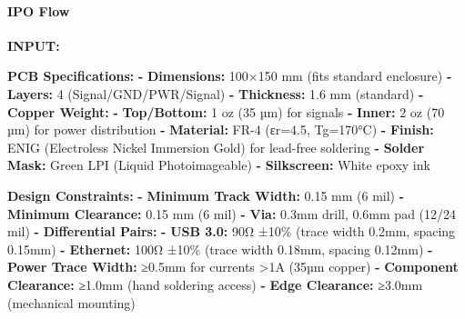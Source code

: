 \documentclass[
]{article}
\newenvironment{Shaded}{\begin{snugshade}}{\end{snugshade}}
\newcommand{\AttributeTok}[1]{\textcolor[rgb]{0.13,0.29,0.53}{#1}}
\newcommand{\FunctionTok}[1]{\textcolor[rgb]{0.13,0.29,0.53}{\textbf{#1}}}
\newcommand{\KeywordTok}[1]{\textcolor[rgb]{0.13,0.29,0.53}{\textbf{#1}}}
\begin{document}
\hypertarget{ipo-flow-3}{%
\paragraph{IPO Flow}\label{ipo-flow-3}}

\textbf{INPUT:}

\begin{Shaded}
\begin{Highlighting}[]
\FunctionTok{PCB Specifications}\KeywordTok{:}
\AttributeTok{  }\KeywordTok{{-}}\AttributeTok{ }\FunctionTok{Dimensions}\KeywordTok{:}\AttributeTok{ 100×150 mm (fits standard enclosure)}
\AttributeTok{  }\KeywordTok{{-}}\AttributeTok{ }\FunctionTok{Layers}\KeywordTok{:}\AttributeTok{ 4 (Signal/GND/PWR/Signal)}
\AttributeTok{  }\KeywordTok{{-}}\AttributeTok{ }\FunctionTok{Thickness}\KeywordTok{:}\AttributeTok{ 1.6 mm (standard)}
\AttributeTok{  }\KeywordTok{{-}}\AttributeTok{ }\FunctionTok{Copper Weight}\KeywordTok{:}
\AttributeTok{      }\KeywordTok{{-}}\AttributeTok{ }\FunctionTok{Top/Bottom}\KeywordTok{:}\AttributeTok{ 1 oz (35 µm) for signals}
\AttributeTok{      }\KeywordTok{{-}}\AttributeTok{ }\FunctionTok{Inner}\KeywordTok{:}\AttributeTok{ 2 oz (70 µm) for power distribution}
\AttributeTok{  }\KeywordTok{{-}}\AttributeTok{ }\FunctionTok{Material}\KeywordTok{:}\AttributeTok{ FR{-}4 (εr=4.5, Tg=170°C)}
\AttributeTok{  }\KeywordTok{{-}}\AttributeTok{ }\FunctionTok{Finish}\KeywordTok{:}\AttributeTok{ ENIG (Electroless Nickel Immersion Gold) for lead{-}free soldering}
\AttributeTok{  }\KeywordTok{{-}}\AttributeTok{ }\FunctionTok{Solder Mask}\KeywordTok{:}\AttributeTok{ Green LPI (Liquid Photoimageable)}
\AttributeTok{  }\KeywordTok{{-}}\AttributeTok{ }\FunctionTok{Silkscreen}\KeywordTok{:}\AttributeTok{ White epoxy ink}

\FunctionTok{Design Constraints}\KeywordTok{:}
\AttributeTok{  }\KeywordTok{{-}}\AttributeTok{ }\FunctionTok{Minimum Track Width}\KeywordTok{:}\AttributeTok{ 0.15 mm (6 mil)}
\AttributeTok{  }\KeywordTok{{-}}\AttributeTok{ }\FunctionTok{Minimum Clearance}\KeywordTok{:}\AttributeTok{ 0.15 mm (6 mil)}
\AttributeTok{  }\KeywordTok{{-}}\AttributeTok{ }\FunctionTok{Via}\KeywordTok{:}\AttributeTok{ 0.3mm drill, 0.6mm pad (12/24 mil)}
\AttributeTok{  }\KeywordTok{{-}}\AttributeTok{ }\FunctionTok{Differential Pairs}\KeywordTok{:}
\AttributeTok{      }\KeywordTok{{-}}\AttributeTok{ }\FunctionTok{USB 3.0}\KeywordTok{:}\AttributeTok{ 90Ω ±10\% (trace width 0.2mm, spacing 0.15mm)}
\AttributeTok{      }\KeywordTok{{-}}\AttributeTok{ }\FunctionTok{Ethernet}\KeywordTok{:}\AttributeTok{ 100Ω ±10\% (trace width 0.18mm, spacing 0.12mm)}
\AttributeTok{  }\KeywordTok{{-}}\AttributeTok{ }\FunctionTok{Power Trace Width}\KeywordTok{:}\AttributeTok{ ≥0.5mm for currents \textgreater{}1A (35µm copper)}
\AttributeTok{  }\KeywordTok{{-}}\AttributeTok{ }\FunctionTok{Component Clearance}\KeywordTok{:}\AttributeTok{ ≥1.0mm (hand soldering access)}
\AttributeTok{  }\KeywordTok{{-}}\AttributeTok{ }\FunctionTok{Edge Clearance}\KeywordTok{:}\AttributeTok{ ≥3.0mm (mechanical mounting)}


\end{Highlighting}
\end{Shaded}
\end{document}
